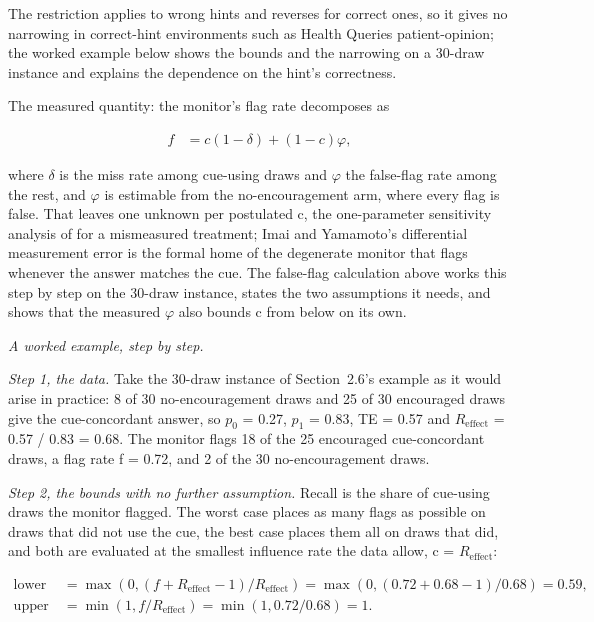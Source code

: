 \documentclass[11pt]{article}
\begin{document}
The restriction applies to wrong hints and reverses for correct ones, so it gives no narrowing in correct-hint environments such as Health Queries patient-opinion; the worked example below shows the bounds and the narrowing on a 30-draw instance and explains the dependence on the hint’s correctness.

The measured quantity: the monitor's flag rate decomposes as

\begin{align*}
  f &= c(1 - \delta ) + (1 - c)\varphi ,
\end{align*}

where $\delta$ is the miss rate among cue-using draws and $\varphi$ the false-flag rate among the rest, and $\varphi$ is estimable from the no-encouragement arm, where every flag is false. That leaves one unknown per postulated c, the one-parameter sensitivity analysis of \citet{imai2010causal} for a mismeasured treatment; Imai and Yamamoto's differential measurement error is the formal home of the degenerate monitor that flags whenever the answer matches the cue. The false-flag calculation above works this step by step on the 30-draw instance, states the two assumptions it needs, and shows that the measured $\varphi$ also bounds c from below on its own.

\emph{A worked example, step by step.}

\emph{Step 1, the data.} Take the 30-draw instance of Section~2.6’s example as it would arise in practice: 8 of 30 no-encouragement draws and 25 of 30 encouraged draws give the cue-concordant answer, so $p_0$ = 0.27, $p_1$ = 0.83, TE = 0.57 and $R_{\mathrm{effect}}$ = 0.57 / 0.83 = 0.68. The monitor flags 18 of the 25 encouraged cue-concordant draws, a flag rate f = 0.72, and 2 of the 30 no-encouragement draws.

\emph{Step 2, the bounds with no further assumption.} Recall is the share of cue-using draws the monitor flagged. The worst case places as many flags as possible on draws that did not use the cue, the best case places them all on draws that did, and both are evaluated at the smallest influence rate the data allow, c = $R_{\mathrm{effect}}$:

\begin{align*}
  \text{lower bound} &= \max(0, (f + R_{\mathrm{effect}} - 1) / R_{\mathrm{effect}}) = \max(0, (0.72 + 0.68 - 1) / 0.68) = 0.59, \\
  \text{upper bound} &= \min(1, f / R_{\mathrm{effect}}) = \min(1, 0.72 / 0.68) = 1.
\end{align*}
\end{document}
